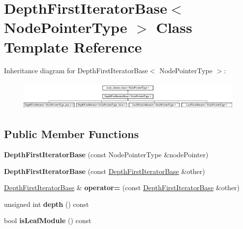 \hypertarget{classDepthFirstIteratorBase}{}\section{Depth\+First\+Iterator\+Base$<$ Node\+Pointer\+Type $>$ Class Template Reference}
\label{classDepthFirstIteratorBase}
Inheritance diagram for Depth\+First\+Iterator\+Base$<$ Node\+Pointer\+Type $>$\+:\begin{figure}[H]
\begin{center}
\leavevmode
\includegraphics[height=1.510791cm]{classDepthFirstIteratorBase}
\end{center}
\end{figure}
\subsection*{Public Member Functions}
\begin{DoxyCompactItemize}
\item 
\mbox{\label{classDepthFirstIteratorBase_a21fca2b9a432319e3d4f3b4fb287f17c}} 
{\bfseries Depth\+First\+Iterator\+Base} (const Node\+Pointer\+Type \&node\+Pointer)
\item 
\mbox{\label{classDepthFirstIteratorBase_a7289374ac66df413b1b94d61b31362e6}} 
{\bfseries Depth\+First\+Iterator\+Base} (const \mbox{\hyperlink{classDepthFirstIteratorBase}{Depth\+First\+Iterator\+Base}} \&other)
\item 
\mbox{\label{classDepthFirstIteratorBase_ad3fd323a3baa5122d962e1f8350317d3}} 
\mbox{\hyperlink{classDepthFirstIteratorBase}{Depth\+First\+Iterator\+Base}} \& {\bfseries operator=} (const \mbox{\hyperlink{classDepthFirstIteratorBase}{Depth\+First\+Iterator\+Base}} \&other)
\item 
\mbox{\label{classDepthFirstIteratorBase_ac0a677b653a54fd6511c13cd223903d3}} 
unsigned int {\bfseries depth} () const
\item 
\mbox{\label{classDepthFirstIteratorBase_ad8ae3f85c52b71163d52e2309ce2ada2}} 
bool {\bfseries is\+Leaf\+Module} () const
\end{DoxyCompactItemize}
